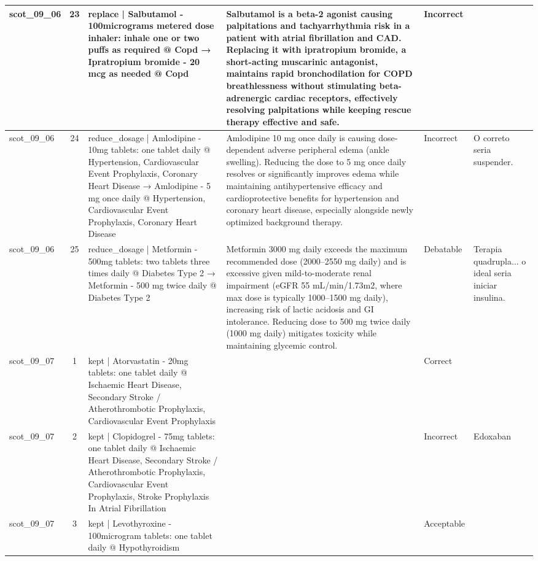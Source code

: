\begin{longtable}{|p{1.45cm}|c|p{3.3cm}|p{6.5cm}|p{1.55cm}|p{2.3cm}|}
\hline
scot\_09\_06 & 23 & replace | Salbutamol - 100micrograms metered dose inhaler: inhale one or two puffs as required @ Copd → Ipratropium bromide - 20 mcg as needed @ Copd & Salbutamol is a beta-2 agonist causing palpitations and tachyarrhythmia risk in a patient with atrial fibrillation and CAD. Replacing it with ipratropium bromide, a short-acting muscarinic antagonist, maintains rapid bronchodilation for COPD breathlessness without stimulating beta-adrenergic cardiac receptors, effectively resolving palpitations while keeping rescue therapy effective and safe. & Incorrect &  \\
\hline
scot\_09\_06 & 24 & reduce\_dosage | Amlodipine - 10mg tablets: one tablet daily @ Hypertension, Cardiovascular Event Prophylaxis, Coronary Heart Disease → Amlodipine - 5 mg once daily @ Hypertension, Cardiovascular Event Prophylaxis, Coronary Heart Disease & Amlodipine 10 mg once daily is causing dose-dependent adverse peripheral edema (ankle swelling). Reducing the dose to 5 mg once daily resolves or significantly improves edema while maintaining antihypertensive efficacy and cardioprotective benefits for hypertension and coronary heart disease, especially alongside newly optimized background therapy. & Incorrect & O correto seria suspender. \\
\hline
scot\_09\_06 & 25 & reduce\_dosage | Metformin - 500mg tablets: two tablets three times daily @ Diabetes Type 2 → Metformin - 500 mg twice daily @ Diabetes Type 2 & Metformin 3000 mg daily exceeds the maximum recommended dose (2000–2550 mg daily) and is excessive given mild-to-moderate renal impairment (eGFR 55 mL/min/1.73m2, where max dose is typically 1000–1500 mg daily), increasing risk of lactic acidosis and GI intolerance. Reducing dose to 500 mg twice daily (1000 mg daily) mitigates toxicity while maintaining glycemic control. & Debatable & Terapia quadrupla... o ideal seria iniciar insulina. \\
\hline
scot\_09\_07 & 1 & kept | Atorvastatin - 20mg tablets: one tablet daily @ Ischaemic Heart Disease, Secondary Stroke / Atherothrombotic Prophylaxis, Cardiovascular Event Prophylaxis &  & Correct &  \\
\hline
scot\_09\_07 & 2 & kept | Clopidogrel - 75mg tablets: one tablet daily @ Ischaemic Heart Disease, Secondary Stroke / Atherothrombotic Prophylaxis, Cardiovascular Event Prophylaxis, Stroke Prophylaxis In Atrial Fibrillation &  & Incorrect & Edoxaban \\
\hline
scot\_09\_07 & 3 & kept | Levothyroxine - 100microgram tablets: one tablet daily @ Hypothyroidism &  & Acceptable &  \\

\end{longtable}
